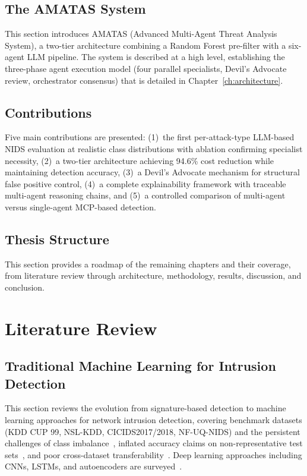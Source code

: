 \documentclass[12pt,openany,oneside,a4paper]{book}
\newcommand{\chap}[1] {Chapter~\ref{#1}}
\begin{document}
\section{The AMATAS System}
\label{sec:amatas-system}
This section introduces AMATAS (Advanced Multi-Agent Threat Analysis System), a two-tier architecture combining a Random Forest pre-filter with a six-agent LLM pipeline. The system is described at a high level, establishing the three-phase agent execution model (four parallel specialists, Devil's Advocate review, orchestrator consensus) that is detailed in \chap{ch:architecture}.

\section{Contributions}
\label{sec:contributions}
Five main contributions are presented: (1)~the first per-attack-type LLM-based NIDS evaluation at realistic class distributions with ablation confirming specialist necessity, (2)~a two-tier architecture achieving 94.6\% cost reduction while maintaining detection accuracy, (3)~a Devil's Advocate mechanism for structural false positive control, (4)~a complete explainability framework with traceable multi-agent reasoning chains, and (5)~a controlled comparison of multi-agent versus single-agent MCP-based detection.

\section{Thesis Structure}
\label{sec:thesis-structure}
This section provides a roadmap of the remaining chapters and their coverage, from literature review through architecture, methodology, results, discussion, and conclusion.


\chapter{Literature Review}
\label{ch:litreview}

\section{Traditional Machine Learning for Intrusion Detection}
\label{sec:traditional-ml-ids}
This section reviews the evolution from signature-based detection to machine learning approaches for network intrusion detection, covering benchmark datasets (KDD CUP 99, NSL-KDD, CICIDS2017/2018, NF-UQ-NIDS) and the persistent challenges of class imbalance~\autocite{Haixiang2017}, inflated accuracy claims on non-representative test sets~\autocite{Leevy2020}, and poor cross-dataset transferability~\autocite{Hesford2024}. Deep learning approaches including CNNs, LSTMs, and autoencoders are surveyed~\autocite{Ferrag2020}.
\end{document}
